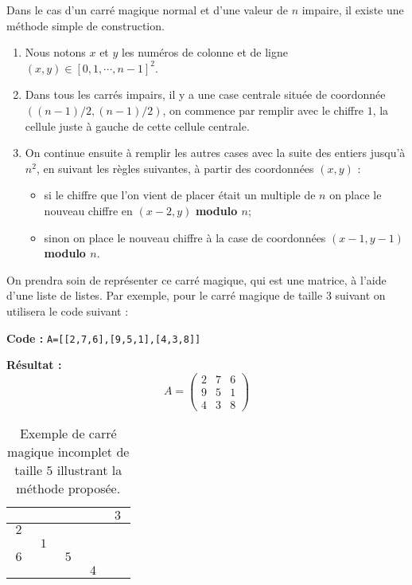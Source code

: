 Dans le cas d'un carré magique normal et d'une valeur de $n$ impaire, il existe une méthode simple de construction.

\begin{enumerate}
	\item Nous notons $x$ et $y$ les numéros de colonne et de ligne $(x,y) \in \left[0,1,\cdots,n-1\right]^2$.
	\item Dans tous les carrés impairs, il y a une case centrale située de coordonnée $((n-1)/2,(n-1)/2)$, on commence par remplir avec le chiffre $1$, la cellule juste à gauche de cette cellule centrale.
\item On continue ensuite à remplir les autres cases avec la suite des entiers jusqu'à $n^2$, en suivant les règles suivantes, à partir des coordonnées $(x,y)$ :
\begin{itemize}
	\item si le chiffre que l'on vient de placer était un multiple de $n$ on place le nouveau chiffre en  $(x-2,y)$ \textbf{modulo $n$};
	\item sinon on place le nouveau chiffre à la case de coordonnées $(x-1,y-1)$ \textbf{modulo $n$}.
\end{itemize}
\end{enumerate}

On prendra soin de représenter ce carré magique, qui est une matrice, à l'aide d'une liste de listes. Par exemple, pour le carré magique de taille 3 suivant on utilisera le code suivant :

\textbf{Code :} \texttt{A=[[2,7,6],[9,5,1],[4,3,8]]}

\textbf{Résultat :}
$$ A=\begin{pmatrix}
			2 & 7 & 6 \\ 
			9 & 5 & 1 \\ 
			4 & 3 & 8 
	\end{pmatrix}
$$

\begin{table}[h]
\renewcommand{\arraystretch}{1.2}
	\centering
		\begin{tabular}{|*{5}{c|}}
			\hline
			 & & & &$~3~$\\
			\hline
			$~2~$& & & & \\
			\hline
			   &$~1~$&   &   &   \\
			\hline
			$~6~$& &$~5~$& & \\
			\hline
			 & & &$~4~$& \\
			\hline
		\end{tabular}
\renewcommand{\arraystretch}{1}
\caption{Exemple de carré magique incomplet de taille $5$ illustrant la méthode proposée.}
\label{Carre5}
\end{table}


